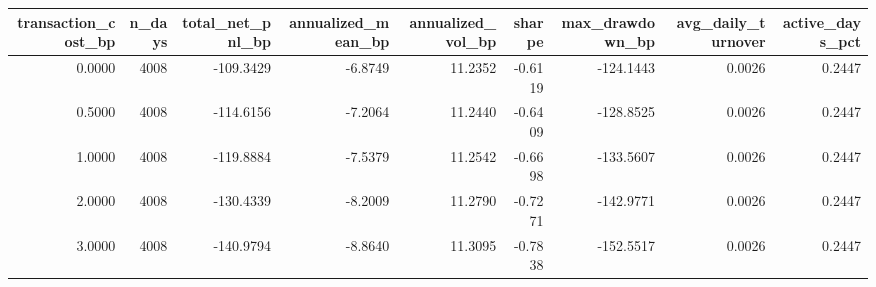 \begin{tabular}{rrrrrrrrr}
\toprule
transaction_cost_bp & n_days & total_net_pnl_bp & annualized_mean_bp & annualized_vol_bp & sharpe & max_drawdown_bp & avg_daily_turnover & active_days_pct \\
\midrule
0.0000 & 4008 & -109.3429 & -6.8749 & 11.2352 & -0.6119 & -124.1443 & 0.0026 & 0.2447 \\
0.5000 & 4008 & -114.6156 & -7.2064 & 11.2440 & -0.6409 & -128.8525 & 0.0026 & 0.2447 \\
1.0000 & 4008 & -119.8884 & -7.5379 & 11.2542 & -0.6698 & -133.5607 & 0.0026 & 0.2447 \\
2.0000 & 4008 & -130.4339 & -8.2009 & 11.2790 & -0.7271 & -142.9771 & 0.0026 & 0.2447 \\
3.0000 & 4008 & -140.9794 & -8.8640 & 11.3095 & -0.7838 & -152.5517 & 0.0026 & 0.2447 \\
\bottomrule
\end{tabular}
